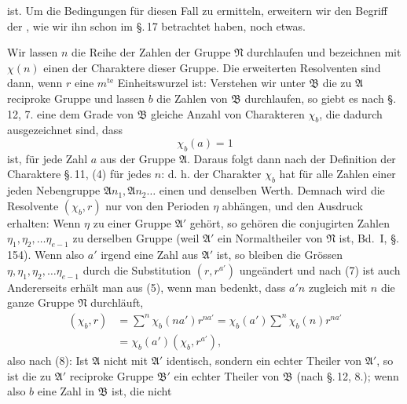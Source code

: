ist. Um die Bedingungen f\"ur diesen Fall zu ermitteln, erweitern
wir den Begriff der , wie wir ihn schon im \S.\,17
betrachtet haben, noch etwas.

Wir lassen $n$ die Reihe der Zahlen der Gruppe $\mathfrak{N}$ durchlaufen
 und bezeichnen mit $\chi(n)$ einen der Charaktere dieser
Gruppe. Die erweiterten Resolventen sind dann, wenn $r$ eine
$m^{\text{te}}$ Einheitswurzel ist:
Verstehen wir unter $\mathfrak{B}$ die zu $\mathfrak{A}$ reciproke Gruppe und lassen
$b$ die Zahlen von $\mathfrak{B}$ durchlaufen, so giebt es nach \S.\,12, 7. eine
dem Grade von $\mathfrak{B}$ gleiche Anzahl von Charakteren $\chi_b$, die dadurch
 ausgezeichnet sind, dass
\[
\chi_b(a) = 1
\]
ist, f\"ur jede Zahl $a$ aus der Gruppe $\mathfrak{A}$. Daraus folgt dann nach
der Definition der Charaktere \S.\,11, (4) f\"ur jedes $n$:
d. h. der Charakter $\chi_b$ hat f\"ur alle Zahlen einer jeden Nebengruppe
 $\mathfrak{A} n_1, \mathfrak{A} n_2 \ldots$ einen und denselben Werth. Demnach wird
die Resolvente $(\chi_b, r)$ nur von den Perioden $\eta$ abh\"angen, und
den Ausdruck erhalten:
Wenn $\eta$ zu einer Gruppe $\mathfrak{A}'$ geh\"ort, so geh\"oren die conjugirten
 Zahlen $\eta_1, \eta_2, \ldots \eta_{e-1}$ zu derselben Gruppe (weil $\mathfrak{A}'$ ein
Normaltheiler von $\mathfrak{N}$ ist, Bd.\ I, \S.\,154). Wenn also $a'$ irgend
eine Zahl aus $\mathfrak{A}'$ ist, so bleiben die Gr\"ossen $\eta, \eta_1, \eta_2, \ldots \eta_{e-1}$
durch die Substitution $(r, r^{a'})$ unge\"andert und nach (7) ist auch
Andererseits erh\"alt man aus (5), wenn man bedenkt, dass
$a' n$ zugleich mit $n$ die ganze Gruppe $\mathfrak{N}$ durchl\"auft,
\[
\begin{aligned}
(\chi_b, r) &= \sum^{n} \chi_b(n a') r^{n a'} = \chi_b(a') \sum^{n} \chi_b(n) r^{n a'}\\
&= \chi_b(a') (\chi_b, r^{a'}),
\end{aligned}
\]
also nach (8):
Ist $\mathfrak{A}$ nicht mit $\mathfrak{A}'$ identisch, sondern ein echter Theiler
von $\mathfrak{A}'$, so ist die zu $\mathfrak{A}'$ reciproke Gruppe $\mathfrak{B}'$ ein echter Theiler
von $\mathfrak{B}$ (nach \S.\,12, 8.); wenn also $b$ eine Zahl in $\mathfrak{B}$ ist, die nicht
